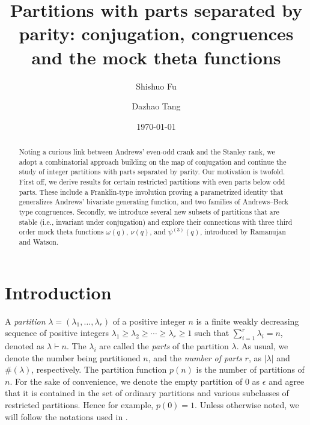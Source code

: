 \documentclass[12pt,reqno]{amsart}
\numberwithin{equation}{section}
\theoremstyle{plain}
\theoremstyle{definition}
\begin{document}
\title[Partitions separated by parity]
{Partitions with parts separated by parity: conjugation, congruences and the mock theta functions}

\author[S. Fu]{Shishuo Fu}
\address[Shishuo Fu]{College of Mathematics and Statistics, Chongqing University, Huxi Campus,
Chongqing 401331, P.R. China}

\author[D. Tang]{Dazhao Tang}
\address[Dazhao Tang]{School of Mathematical Sciences, Chongqing Normal University,
Chongqing 401331, P.R. China}

\date{\today}


\begin{abstract}
Noting a curious link between Andrews' even-odd crank and the Stanley rank, we adopt a combinatorial approach
building on the map of conjugation and continue the study of integer partitions with parts separated by
parity. Our motivation is twofold. First off, we derive results for certain restricted partitions with even
parts below odd parts. These include a Franklin-type involution proving a parametrized identity that
generalizes Andrews' bivariate generating function, and two families of Andrews--Beck type congruences.
Secondly, we introduce several new subsets of partitions that are stable (i.e., invariant under conjugation)
and explore their connections with three third order mock theta functions $\omega(q)$, $\nu(q)$, and
$\psi^{(3)}(q)$, introduced by Ramanujan and Watson.
\end{abstract}




\maketitle






\section{Introduction}\label{sec:intro}


A \emph{partition} $\lambda=(\lambda_1,\ldots,\lambda_r)$ of a positive integer $n$ is a finite weakly
decreasing sequence of positive integers $\lambda_{1}\geq\lambda_{2}\geq\cdots\geq\lambda_{r}\ge 1$ such that
$\sum_{i=1}^{r}\lambda_{i}=n$, denoted as $\lambda\vdash n$. The $\lambda_{i}$ are called the \emph{parts} of
the partition $\lambda$. As usual, we denote the number being partitioned $n$, and the {\em number of parts}
$r$, as $|\lambda|$ and $\#(\lambda)$, respectively. The partition function $p(n)$ is the number of
partitions of $n$. For the sake of convenience, we denote the empty partition of $0$ as $\epsilon$ and agree
that it is contained in the set of ordinary partitions and various subclasses of restricted partitions. Hence
for example, $p(0)=1$. Unless otherwise noted, we will follow the notations used in \cite{and}.
\end{document}
